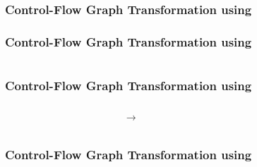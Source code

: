 \begin{frame}[t]
	\frametitle{Control-Flow Graph Transformation using \qvasr}
	\resizebox{\textwidth}{!}{}
\end{frame}

\begin{frame}[t]
	\frametitle{Control-Flow Graph Transformation using \qvasr}
	\begin{columns}
		\begin{column}{0.4\textwidth}
			\resizebox{0.75\textwidth}{!}{}
		\end{column}
		\begin{column}{0.4\textwidth}
			\onslide<3->
			\resizebox{0.6\textwidth}{!}{}
		\end{column}
	\end{columns}
\end{frame}

\begin{frame}[t]
	\frametitle{Control-Flow Graph Transformation using \qvasr}
	\begin{center}
		\begin{columns}[c]
			\begin{column}{0.4\textwidth}
				\resizebox{0.6\textwidth}{!}{}
			\end{column}
			\begin{column}{0.03\textwidth}
				$\rightarrow$
			\end{column}
			\begin{column}{0.4\textwidth}
					\resizebox{\textwidth}{!}{}
			\end{column}
		\end{columns}
		\end{center}
\end{frame}

\begin{frame}[t]
	\frametitle{Control-Flow Graph Transformation using \qvasr}
	\begin{columns}
		\begin{column}{0.4\textwidth}
			\resizebox{0.75\textwidth}{!}{}
		\end{column}
			\begin{column}{0.4\textwidth}
				\resizebox{\textwidth}{!}{}
			\end{column}
	\end{columns}
\end{frame}


